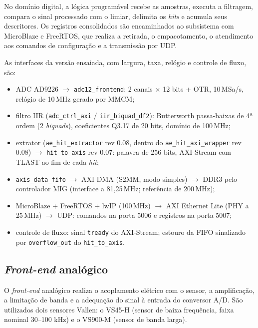 No domínio digital, a lógica programável recebe as amostras, executa a filtragem, compara o sinal processado com o limiar, delimita os \textit{hits} e acumula seus descritores. Os registros consolidados são encaminhados ao subsistema com MicroBlaze e FreeRTOS, que realiza a retirada, o empacotamento, o atendimento aos comandos de configuração e a transmissão por UDP.

As interfaces da versão ensaiada, com largura, taxa, relógio e controle de fluxo, são:
\begin{itemize}
	\item ADC AD9226 \(\rightarrow\) \texttt{adc12\_frontend}: 2 canais \(\times\) 12 bits + OTR, 10\,MSa/s, relógio de 10\,MHz gerado por MMCM;
	\item filtro IIR (\texttt{adc\_ctrl\_axi} / \texttt{iir\_biquad\_df2}): Butterworth passa-baixas de 4ª ordem (2 \textit{biquads}), coeficientes Q3.17 de 20 bits, domínio de 100\,MHz;
	\item extrator (\texttt{ae\_hit\_extractor} rev 0.08, dentro do \texttt{ae\_hit\_axi\_wrapper} rev 0.08) \(\rightarrow\) \texttt{hit\_to\_axis} rev 0.07: palavra de 256 bits, AXI-Stream com TLAST ao fim de cada \textit{hit};
	\item \texttt{axis\_data\_fifo} \(\rightarrow\) AXI DMA (S2MM, modo simples) \(\rightarrow\) DDR3 pelo controlador MIG (interface a 81,25\,MHz; referência de 200\,MHz);
	\item MicroBlaze + FreeRTOS + lwIP (100\,MHz) \(\rightarrow\) AXI Ethernet Lite (PHY a 25\,MHz) \(\rightarrow\) UDP: comandos na porta 5006 e registros na porta 5007;
	\item controle de fluxo: sinal \texttt{tready} do AXI-Stream; estouro da FIFO sinalizado por \texttt{overflow\_out} do \texttt{hit\_to\_axis}.
\end{itemize}

\subsection{\textit{Front-end} analógico}
\label{v2:subsec:front_end_analogico}

O \textit{front-end} analógico realiza o acoplamento elétrico com o sensor, a amplificação, a limitação de banda e a adequação do sinal à entrada do conversor A/D. São utilizados dois sensores Vallen: o VS45-H (sensor de baixa frequência, faixa nominal 30–100 kHz) e o VS900-M (sensor de banda larga).

